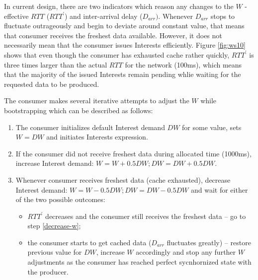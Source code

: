 \documentclass{icn/sig-alternate-2012} %
\newcommand{\wConcept}{Interest demand}
\begin{document}
In current design, there are two indicators which reason any changes to the $W$  - effective $RTT$ ($RTT^\prime$) and inter-arrival delay ($D_{arr})$. Whenever $D_{arr}$ stops to fluctuate outrageously and begin to deviate around constant value, that means that consumer receives the freshest data available. However, it does not necessarily mean that the consumer issues Interests efficiently. Figure \ref{fig:ws10} shows that even though the consumer has exhausted cache rather quickly, $RTT^\prime$ is three times larger than the actual $RTT$ for the network (100ms), which means that the majority of the issued Interests remain pending whlie waiting for the requested data to be produced.

The consumer makes several iterative attempts to adjust the $W$ while bootstrapping which can be described as follows:

\begin{enumerate}
\item The consumer initializes default \wConcept{} $DW$ for some value, sets $W=DW$ and initiates Interests expression.
\item If the consumer did not receive freshest data during allocated time (1000ms), increase \wConcept{}: $W=W+0.5DW; DW = DW+0.5DW$.
\item \label{decrease-w} Whenever consumer receives freshest data (cache exhausted), decrease \wConcept{}: $W=W-0.5DW; DW = DW-0.5DW$ and wait for either of the two possible outcomes:
\begin{itemize}
\item $RTT^\prime$ decreases and the consumer still receives the freshest data -- go to step \ref{decrease-w};
\item the consumer starts to get cached data ($D_{arr}$ fluctuates greatly) -- restore previous value for $DW$, increase $W$ accordingly and stop any further $W$ adjustments as the consumer has reached perfect sycnhornized state with the producer.
\end{itemize}
\end{enumerate}




\end{document}
